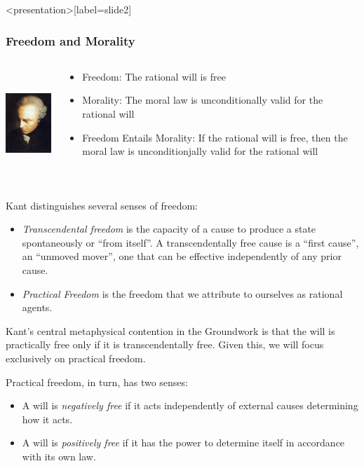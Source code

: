 \begin{frame}<presentation>[label=slide2]
    \frametitle{Freedom and Morality}
        \begin{columns}
            \begin{column}{3cm}
                \includegraphics[height=4cm]{../../graphics/kant.jpg}
            \end{column}
            \begin{column}{7cm}
                \begin{itemize}
                    \item \alert{Freedom}: The rational will is free
                    \item \alert{Morality}: The moral law is unconditionally valid for the rational will
                    \item \alert{Freedom Entails Morality}: If the rational will is free, then the moral law is unconditionjally valid for the rational will
                \end{itemize}
            \end{column}
        \end{columns}
\end{frame}

Kant distinguishes several senses of freedom:
\begin{itemize}
    \item \emph{Transcendental freedom} is the capacity of a cause to produce a state spontaneously or ``from itself''. A transcendentally free cause is a ``first cause'', an ``unmoved mover'', one that can be effective independently of any prior cause.
    \item \emph{Practical Freedom} is the freedom that we attribute to ourselves as rational agents.
\end{itemize}
Kant’s central metaphysical contention in the Groundwork is that the will is practically free only if it is transcendentally free. Given this, we will focus exclusively on practical freedom. 

Practical freedom, in turn, has two senses:
\begin{itemize}
    \item A will is \emph{negatively free} if it acts independently of external causes determining how it acts.
    \item A will is \emph{positively free} if it has the power to determine itself in accordance with its own law.
\end{itemize}

